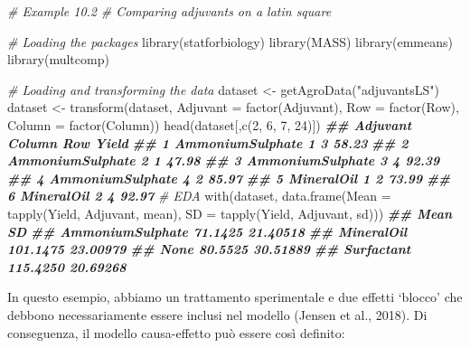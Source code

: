 \documentclass[
  12pt,
]{book}
\newenvironment{Shaded}{\begin{snugshade}}{\end{snugshade}}
\newcommand{\AttributeTok}[1]{\textcolor[rgb]{0.77,0.63,0.00}{#1}}
\newcommand{\CommentTok}[1]{\textcolor[rgb]{0.56,0.35,0.01}{\textit{#1}}}
\newcommand{\DecValTok}[1]{\textcolor[rgb]{0.00,0.00,0.81}{#1}}
\newcommand{\DocumentationTok}[1]{\textcolor[rgb]{0.56,0.35,0.01}{\textbf{\textit{#1}}}}
\newcommand{\FunctionTok}[1]{\textcolor[rgb]{0.00,0.00,0.00}{#1}}
\newcommand{\NormalTok}[1]{#1}
\newcommand{\OtherTok}[1]{\textcolor[rgb]{0.56,0.35,0.01}{#1}}
\newcommand{\StringTok}[1]{\textcolor[rgb]{0.31,0.60,0.02}{#1}}
\begin{document}
\begin{Shaded}
\begin{Highlighting}[]
\CommentTok{\# Example 10.2}
\CommentTok{\# Comparing adjuvants on a latin square}

\CommentTok{\# Loading the packages}
\FunctionTok{library}\NormalTok{(statforbiology)}
\FunctionTok{library}\NormalTok{(MASS)}
\FunctionTok{library}\NormalTok{(emmeans)}
\FunctionTok{library}\NormalTok{(multcomp)}

\CommentTok{\# Loading and transforming the data}
\NormalTok{dataset }\OtherTok{\textless{}{-}} \FunctionTok{getAgroData}\NormalTok{(}\StringTok{"adjuvantsLS"}\NormalTok{)}
\NormalTok{dataset }\OtherTok{\textless{}{-}} \FunctionTok{transform}\NormalTok{(dataset, }
                     \AttributeTok{Adjuvant =} \FunctionTok{factor}\NormalTok{(Adjuvant),}
                     \AttributeTok{Row =} \FunctionTok{factor}\NormalTok{(Row),}
                     \AttributeTok{Column =} \FunctionTok{factor}\NormalTok{(Column))}
\FunctionTok{head}\NormalTok{(dataset[,}\FunctionTok{c}\NormalTok{(}\DecValTok{2}\NormalTok{, }\DecValTok{6}\NormalTok{, }\DecValTok{7}\NormalTok{, }\DecValTok{24}\NormalTok{)])}
\DocumentationTok{\#\#           Adjuvant Column Row Yield}
\DocumentationTok{\#\# 1 AmmoniumSulphate      1   3 58.23}
\DocumentationTok{\#\# 2 AmmoniumSulphate      2   1 47.98}
\DocumentationTok{\#\# 3 AmmoniumSulphate      3   4 92.39}
\DocumentationTok{\#\# 4 AmmoniumSulphate      4   2 85.97}
\DocumentationTok{\#\# 5       MineralOil      1   2 73.99}
\DocumentationTok{\#\# 6       MineralOil      2   4 92.97}
\CommentTok{\# EDA}
\FunctionTok{with}\NormalTok{(dataset, }\FunctionTok{data.frame}\NormalTok{(}\AttributeTok{Mean =} \FunctionTok{tapply}\NormalTok{(Yield, Adjuvant, mean),}
                         \AttributeTok{SD =} \FunctionTok{tapply}\NormalTok{(Yield, Adjuvant, sd)))}
\DocumentationTok{\#\#                      Mean       SD}
\DocumentationTok{\#\# AmmoniumSulphate  71.1425 21.40518}
\DocumentationTok{\#\# MineralOil       101.1475 23.00979}
\DocumentationTok{\#\# None              80.5525 30.51889}
\DocumentationTok{\#\# Surfactant       115.4250 20.69268}
\end{Highlighting}
\end{Shaded}

In questo esempio, abbiamo un trattamento sperimentale e due effetti `blocco' che debbono necessariamente essere inclusi nel modello (Jensen et al., 2018). Di conseguenza, il modello causa-effetto può essere così definito:
\end{document}
